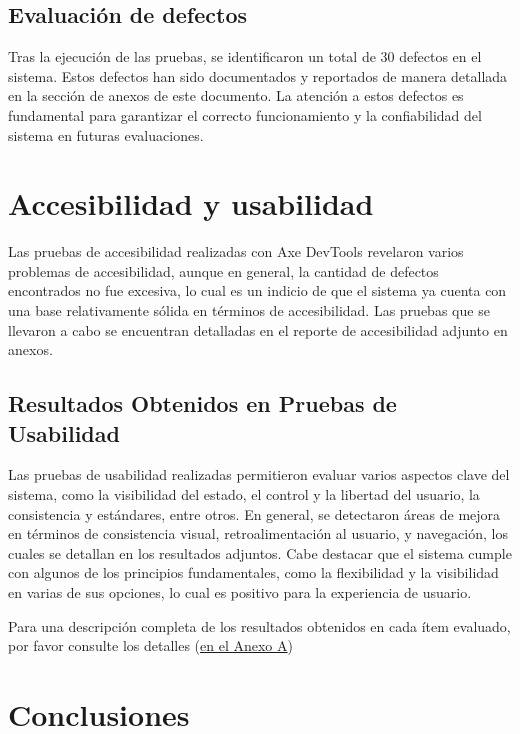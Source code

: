 \documentclass[stu, 12pt, letterpaper, donotrepeattitle, floatsintext, natbib]{apa7}
\begin{document}
\subsection{Evaluación de defectos}

Tras la ejecución de las pruebas, se identificaron un total de 30 defectos en el sistema. Estos defectos han sido documentados y reportados de manera detallada en la sección de anexos de este documento. La atención a estos defectos es fundamental para garantizar el correcto funcionamiento y la confiabilidad del sistema en futuras evaluaciones. 



\newpage

\section{Accesibilidad y usabilidad}

Las pruebas de accesibilidad realizadas con Axe DevTools revelaron varios problemas de accesibilidad, aunque en general, la cantidad de defectos encontrados no fue excesiva, lo cual es un indicio de que el sistema ya cuenta con una base relativamente sólida en términos de accesibilidad. Las pruebas que se llevaron a cabo se encuentran detalladas en el reporte de accesibilidad adjunto en anexos.
\subsection{Resultados Obtenidos en Pruebas de Usabilidad}

Las pruebas de usabilidad realizadas permitieron evaluar varios aspectos clave del sistema, como la visibilidad del estado, el control y la libertad del usuario, la consistencia y estándares, entre otros. En general, se detectaron áreas de mejora en términos de consistencia visual, retroalimentación al usuario, y navegación, los cuales se detallan en los resultados adjuntos. Cabe destacar que el sistema cumple con algunos de los principios fundamentales, como la flexibilidad y la visibilidad en varias de sus opciones, lo cual es positivo para la experiencia de usuario.

\noindent Para una descripción completa de los resultados obtenidos en cada ítem evaluado, por favor consulte los detalles (\hyperref[tab:reporte_usabilidad]{en el Anexo A})

\newpage
\section{Conclusiones}
\end{document}
